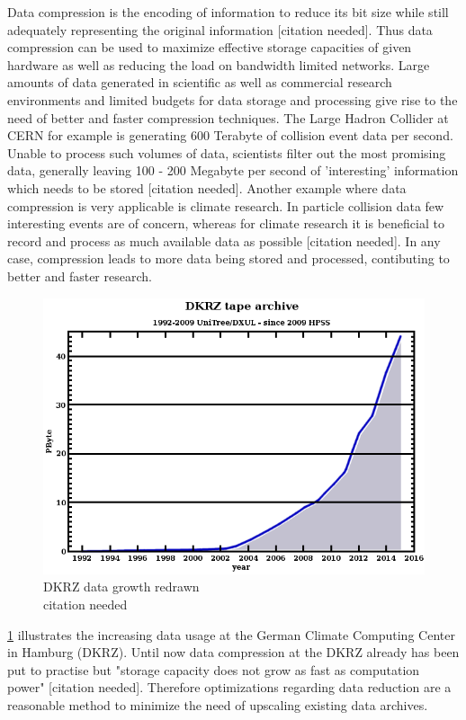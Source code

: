 \documentclass[
	12pt,
	a4paper,
	BCOR10mm,
	DIV14,
	headsepline,
]{scrreprt}
\begin{document}
\bigskip

Data compression is the encoding of information to reduce its bit size while
still adequately representing the original information [citation needed].
Thus data compression can be used to maximize effective storage capacities of
given hardware as well as reducing the load on bandwidth limited networks.
Large amounts of data generated in scientific as well as commercial research
environments and limited budgets for data storage and processing give rise to
the need of better and faster compression techniques. The Large Hadron Collider
at CERN for example is generating 600 Terabyte of collision event data per
second. Unable to process such volumes of data, scientists filter out the most
promising data, generally leaving 100 - 200 Megabyte per second of 'interesting'
information which needs to be stored [citation needed]. Another example where
data compression is very applicable is climate research. In particle collision
data few interesting events are of concern, whereas for climate research it is
beneficial to record and process as much available data as possible
[citation needed]. In any case, compression leads to more data being stored and
processed, contibuting to better and faster research.

\begin{figure}
	\includegraphics[width=0.9\linewidth]{DKRZ_data_growth.png}
	\caption{DKRZ data growth redrawn\\ citation needed}
	\label{fig:dkrz}
\end{figure}

\cref{fig:dkrz} illustrates the increasing data usage at the German Climate
Computing Center in Hamburg (DKRZ). Until now data compression at the DKRZ
already has been put to practise but "storage capacity does not grow as fast as
computation power" [citation needed]. Therefore optimizations regarding data
reduction are a reasonable method to minimize the need of upscaling existing
data archives.
\end{document}
